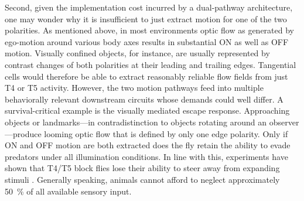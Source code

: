Second, given the implementation cost incurred by a dual-pathway architecture, one may wonder why it is insufficient to just extract motion for one of the two polarities. As mentioned above, in most environments optic flow as generated by ego-motion around various body axes results in substantial ON as well as OFF motion. Visually confined objects, for instance, are usually represented by contrast changes of both polarities at their leading and trailing edges. Tangential cells would therefore be able to extract reasonably reliable flow fields from just T4 or T5 activity. However, the two motion pathways feed into multiple behaviorally relevant downstream circuits whose demands could well differ. A survival-critical example is the visually mediated escape response. Approaching objects or landmarks---in contradistinction to objects rotating around an observer---produce looming optic flow that is defined by only one edge polarity. Only if ON and OFF motion are both extracted does the fly retain the ability to evade predators under all illumination conditions. In line with this, experiments have shown that T4/T5 block flies lose their ability to steer away from expanding stimuli \citep{Schilling:2015jh}. Generally speaking, animals cannot afford to neglect approximately \SI{50}{\percent} of all available sensory input.

